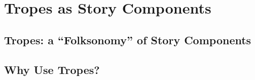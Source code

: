 \chapter{Tropes as Story Components}
\label{cha:tropes}
\section{Tropes: a ``Folksonomy'' of Story Components}

\section{Why Use Tropes?}
